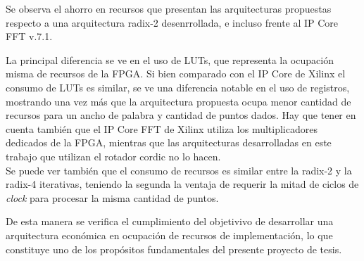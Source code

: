 Se observa el ahorro en recursos que presentan las arquitecturas propuestas respecto a una
arquitectura radix-2 desenrrollada, e incluso frente al IP Core FFT v.7.1.

La principal diferencia se ve en el uso de LUTs, que representa la ocupación misma de recursos de la
FPGA. Si bien comparado con el IP Core de Xilinx el consumo de LUTs es similar, se ve una
diferencia notable en el uso de registros, mostrando una vez más que la arquitectura propuesta
ocupa menor cantidad de recursos para un ancho de palabra y cantidad de puntos dados. Hay que
tener en cuenta también que el IP Core FFT de Xilinx utiliza los multiplicadores dedicados de la
FPGA, mientras que las arquitecturas desarrolladas en este trabajo que utilizan el rotador cordic
no lo hacen.\\
Se puede ver también que el consumo de recursos es similar entre la radix-2 y la radix-4 iterativas,
teniendo la segunda la ventaja de requerir la mitad de ciclos de \textit{clock} para procesar la
misma cantidad de puntos.

De esta manera se verifica el cumplimiento del objetivivo de desarrollar una arquitectura económica
en ocupación de recursos de implementación, lo que constituye uno de los propósitos fundamentales
del presente proyecto de tesis.
